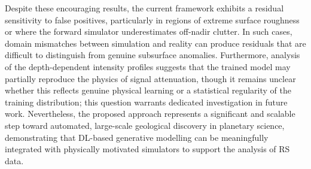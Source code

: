 Despite these encouraging results, the current framework exhibits a residual sensitivity to false positives, particularly in regions of extreme surface roughness or where the forward simulator underestimates off-nadir clutter.
In such cases, domain mismatches between simulation and reality can produce residuals that are difficult to distinguish from genuine subsurface anomalies.
Furthermore, analysis of the depth-dependent intensity profiles suggests that the trained model may partially reproduce the physics of signal attenuation, though it remains unclear whether this reflects genuine physical learning or a statistical regularity of the training distribution; this question warrants dedicated investigation in future work.
Nevertheless, the proposed approach represents a significant and scalable step toward automated, large-scale geological discovery in planetary science, demonstrating that DL-based generative modelling can be meaningfully integrated with physically motivated simulators to support the analysis of RS data.



